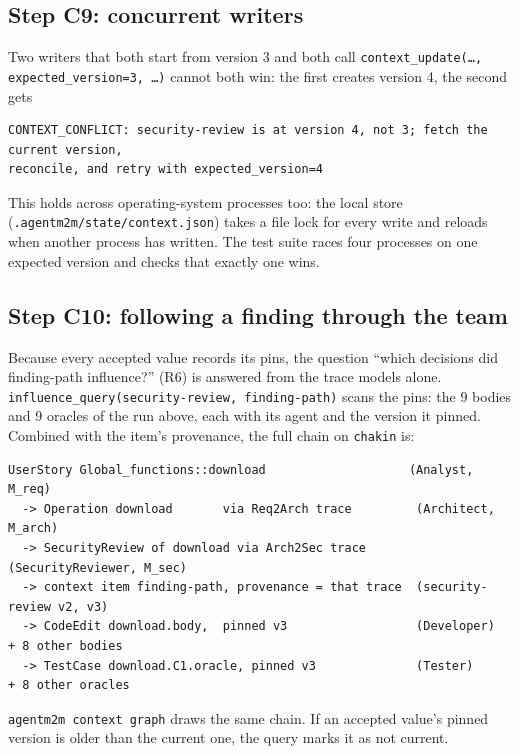 \documentclass[10pt,a4paper]{article}
\newcommand{\code}[1]{\texttt{#1}}
\newcommand{\file}[1]{\texttt{#1}}
\theoremstyle{definition}
\begin{document}
\subsection{Step C9: concurrent writers}

Two writers that both start from version 3 and both call
\code{context\_update(\ldots, expected\_version=3, \ldots)} cannot both win:
the first creates version 4, the second gets

\begin{lstlisting}[style=engine]
CONTEXT_CONFLICT: security-review is at version 4, not 3; fetch the current version,
reconcile, and retry with expected_version=4
\end{lstlisting}

\noindent This holds across operating-system processes too: the local store
(\file{.agentm2m/state/context.json}) takes a file lock for every write and
reloads when another process has written. The test suite races four
processes on one expected version and checks that exactly one wins.

\subsection{Step C10: following a finding through the team}\label{sec:influence}

Because every accepted value records its pins, the question ``which decisions
did finding-path influence?'' (R6) is answered from the trace models alone.
\code{influence\_query(security-review, finding-path)} scans the pins: the 9
bodies and 9 oracles of the run above, each with its agent and the version it
pinned. Combined with the item's provenance, the full chain on
\texttt{chakin} is:

\begin{lstlisting}[style=engine, caption={The chain of \code{finding-path}, reconstructed from provenance, pins and trace links.}]
UserStory Global_functions::download                    (Analyst, M_req)
  -> Operation download       via Req2Arch trace         (Architect, M_arch)
  -> SecurityReview of download via Arch2Sec trace        (SecurityReviewer, M_sec)
  -> context item finding-path, provenance = that trace  (security-review v2, v3)
  -> CodeEdit download.body,  pinned v3                  (Developer)   + 8 other bodies
  -> TestCase download.C1.oracle, pinned v3              (Tester)      + 8 other oracles
\end{lstlisting}

\noindent \code{agentm2m context graph} draws the same chain. If an
accepted value's pinned version is older than the current one, the query
marks it as not current.
\end{document}
